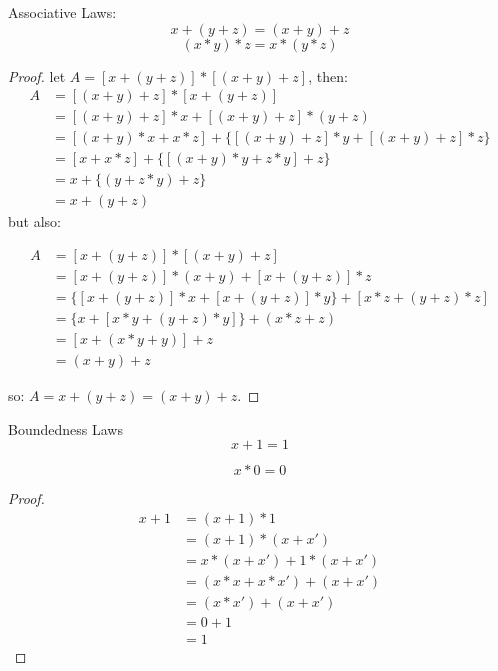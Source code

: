 \documentclass{article}
\begin{document}
Associative Laws:
\begin{equation}
x + (y + z) = (x + y) + z
\end{equation}
\begin{equation}
(x * y) * z = x * (y * z)
\end{equation}

\begin{proof}
let $A = [x + (y + z)] * [(x + y) + z]$, then:
\begin{align*}
A & = [(x + y) + z] * [x + (y + z)] \\
  & = [(x + y) + z] * x + [(x + y) + z] * (y + z) \\
  & = [(x + y) * x + x * z] + \{[(x + y) + z] * y + [(x + y) + z] * z\} \\
  & = [x + x * z] + \{[(x + y) * y + z * y] + z\} \\
  & = x + \{(y + z * y) + z\} \\
  & = x + (y + z)
\end{align*}
but also:

\begin{align*}
A & = [x + (y + z)] * [(x + y) + z] \\
  & = [x + (y + z)] * (x + y) + [x + (y + z)] * z \\
  & = \{[x + (y + z)] * x + [x + (y + z)] * y\} + [x * z + (y + z) * z]\\
  & = \{x + [x * y + (y + z) * y]\} + (x * z + z)\\
  & = [x + (x * y + y)] + z\\
  & = (x + y) + z
\end{align*}

so: $A = x + (y + z) = (x + y) + z$.
\end{proof}

Boundedness Laws
\begin{equation}
x + 1 = 1
\end{equation}

\begin{equation}
x * 0 = 0
\end{equation}

\begin{proof}
\begin{align*}
x + 1 & = (x + 1) * 1 \\
      & = (x + 1) * (x + x') \\
      & = x * (x + x') + 1 * (x + x') \\
      & = (x * x + x * x') + (x + x') \\
      & = (x * x') + (x + x') \\
      & = 0 + 1 \\
      & = 1
\end{align*}
\end{proof}
\end{document}

